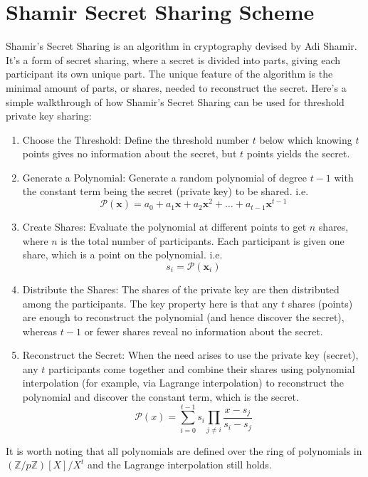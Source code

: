 \documentclass[11pt]{article}
\begin{document}
\section{Shamir Secret Sharing Scheme}
Shamir's Secret Sharing is an algorithm in cryptography devised by Adi Shamir. It's a form of secret sharing, where a secret is divided into parts, giving each participant its own unique part. The unique feature of the algorithm is the minimal amount of parts, or shares, needed to reconstruct the secret.
Here's a simple walkthrough of how Shamir's Secret Sharing can be used for threshold private key sharing:
\begin{enumerate}
	\item Choose the Threshold: Define the threshold number $t$ below which knowing $t$ points gives no information about the secret, but $t$ points yields the secret.
	\item Generate a Polynomial: Generate a random polynomial of degree $t-1$ with the constant term being the secret (private key) to be shared. i.e. \begin{equation}\mathcal{P}(\mathbf{x})=a_0+a_1\mathbf{x}+a_2\mathbf{x}^2+\ldots+a_{t-1}\mathbf{x}^{t-1}\end{equation}
	\item Create Shares: Evaluate the polynomial at different points to get $n$ shares, where $n$ is the total number of participants. Each participant is given one share, which is a point on the polynomial. i.e. \begin{equation}s_i=\mathcal{P}(\mathbf{x}_i)\end{equation}
	\item Distribute the Shares: The shares of the private key are then distributed among the participants. The key property here is that any $t$ shares (points) are enough to reconstruct the polynomial (and hence discover the secret), whereas $t-1$ or fewer shares reveal no information about the secret.
	\item Reconstruct the Secret: When the need arises to use the private key (secret), any $t$ participants come together and combine their shares using polynomial interpolation (for example, via Lagrange interpolation) to reconstruct the polynomial and discover the constant term, which is the secret.
	\begin{equation}\mathcal{P}(x)=\sum^{t-1}_{i=0}s_i\prod_{j\neq i}\frac{x-s_j}{s_i-s_j}\end{equation}

\end{enumerate}
It is worth noting that all polynomials are defined over the ring of polynomials in $(\mathbb{Z}/p\mathbb{Z})[X]/X^{t}$ and the Lagrange interpolation still holds.
\end{document}
